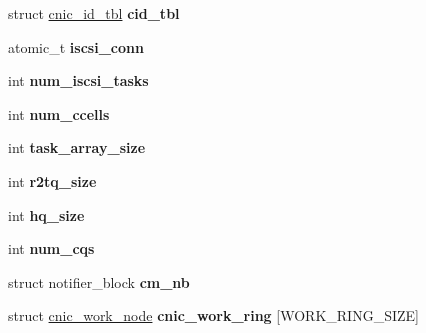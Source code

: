\begin{DoxyCompactItemize}
\item 
\hypertarget{structcnic__local_ab2429d8d0044e38b042e06293083a974}{
struct \hyperlink{structcnic__id__tbl}{cnic\_\-id\_\-tbl} {\bfseries cid\_\-tbl}}
\label{structcnic__local_ab2429d8d0044e38b042e06293083a974}

\item 
\hypertarget{structcnic__local_abd121fb21c589a3e1c0eca8ca0944231}{
atomic\_\-t {\bfseries iscsi\_\-conn}}
\label{structcnic__local_abd121fb21c589a3e1c0eca8ca0944231}

\item 
\hypertarget{structcnic__local_a0fe84869b3c73cc9823da9a073a7617b}{
int {\bfseries num\_\-iscsi\_\-tasks}}
\label{structcnic__local_a0fe84869b3c73cc9823da9a073a7617b}

\item 
\hypertarget{structcnic__local_a11fc71c65b8299003e202aedcabcd751}{
int {\bfseries num\_\-ccells}}
\label{structcnic__local_a11fc71c65b8299003e202aedcabcd751}

\item 
\hypertarget{structcnic__local_a1178a65c170b5577daec36e4b96173de}{
int {\bfseries task\_\-array\_\-size}}
\label{structcnic__local_a1178a65c170b5577daec36e4b96173de}

\item 
\hypertarget{structcnic__local_ac16014ca2d1b9d74a124a13ee35791ba}{
int {\bfseries r2tq\_\-size}}
\label{structcnic__local_ac16014ca2d1b9d74a124a13ee35791ba}

\item 
\hypertarget{structcnic__local_a0da7a49f84efe2158f072222bf70d7a4}{
int {\bfseries hq\_\-size}}
\label{structcnic__local_a0da7a49f84efe2158f072222bf70d7a4}

\item 
\hypertarget{structcnic__local_acabe7ae33974f37b9f20ef5c32d09ca5}{
int {\bfseries num\_\-cqs}}
\label{structcnic__local_acabe7ae33974f37b9f20ef5c32d09ca5}

\item 
\hypertarget{structcnic__local_a3caa95eee2ef2361f683ca595163f3cd}{
struct notifier\_\-block {\bfseries cm\_\-nb}}
\label{structcnic__local_a3caa95eee2ef2361f683ca595163f3cd}

\item 
\hypertarget{structcnic__local_ad013e3e9c7b192b8a2ec0e621d657e29}{
struct \hyperlink{structcnic__work__node}{cnic\_\-work\_\-node} {\bfseries cnic\_\-work\_\-ring} \mbox{[}WORK\_\-RING\_\-SIZE\mbox{]}}
\label{structcnic__local_ad013e3e9c7b192b8a2ec0e621d657e29}


\end{DoxyCompactItemize}
